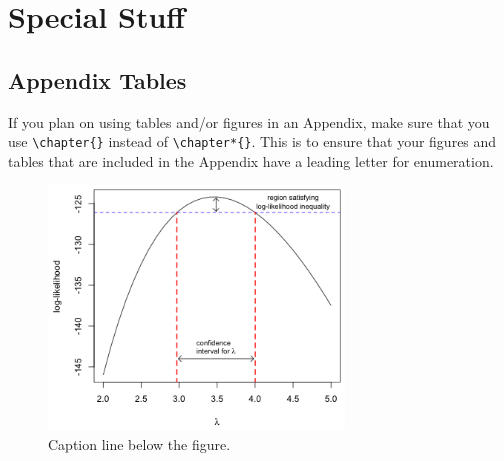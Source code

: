 \chapter{Special Stuff}
\label{AppA}

\section{Appendix Tables}
If you plan on using tables and/or figures in an Appendix, make sure that you use \verb+\chapter{}+ instead of \verb+\chapter*{}+. This is to ensure that your figures and tables that are included in the Appendix have a leading letter for enumeration. 

\begin{figure}[H] %
\centering
\includegraphics[width=0.7\textwidth]{./figures/proflike_example}
\caption[External figure]{Caption line below the figure.} %
\label{fig:proflike}
\end{figure}